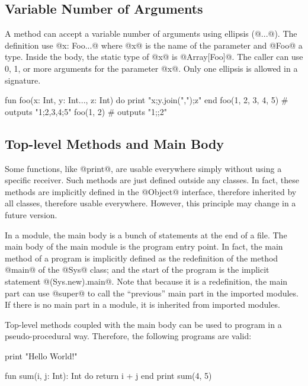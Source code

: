 
\subsection{Variable Number of Arguments}\label{vararg}

A method can accept a variable number of arguments using ellipsis (@...@).
The definition use @x: Foo...@ where @x@ is the name of the parameter and @Foo@ a type.
Inside the body, the static type of @x@ is @Array[Foo]@.
The caller can use 0, 1, or more arguments for the parameter @x@.
Only one ellipsis is allowed in a signature.

\begin{lst}
fun foo(x: Int, y: Int..., z: Int)
do
	print "{x};{y.join(",")};{z}"
end
foo(1, 2, 3, 4, 5) # outputs "1;2,3,4;5"
foo(1, 2) # outputs "1;;2"
\end{lst}

\subsection{Top-level Methods and Main Body}\label{toplevel}

Some functions, like @print@, are usable everywhere simply without using a specific receiver.
Such methods are just defined outside any classes.
In fact, these methods are implicitly defined in the @Object@ interface, therefore inherited by all classes, therefore usable everywhere.
However, this principle may change in a future version.

In a module, the main body is a bunch of statements at the end of a file.
The main body of the main module is the program entry point.
In fact, the main method of a program is implicitly defined as the redefinition of the method @main@ of the @Sys@ class; and the start of the program is the implicit statement @(Sys.new).main@.
Note that because it is a redefinition, the main part can use @super@ to call the ``previous'' main part in the imported modules.
If there is no main part in a module, it is inherited from imported modules.

Top-level methods coupled with the main body can be used to program in a pseudo-procedural way.
Therefore, the following programs are valid:
\begin{multicols}{2}
\begin{lst}
print "Hello World!"
\end{lst}
\columnbreak 
\begin{lst}
fun sum(i, j: Int): Int
do
	return i + j
end
print sum(4, 5)
\end{lst}
\end{multicols}

